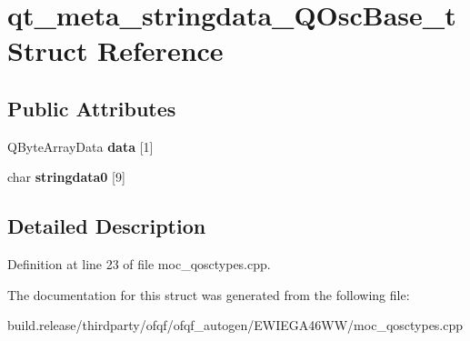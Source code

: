 \hypertarget{structqt__meta__stringdata___q_osc_base__t}{}\section{qt\+\_\+meta\+\_\+stringdata\+\_\+\+Q\+Osc\+Base\+\_\+t Struct Reference}
\label{structqt__meta__stringdata___q_osc_base__t}
\subsection*{Public Attributes}
\begin{DoxyCompactItemize}
\item 
\mbox{\label{structqt__meta__stringdata___q_osc_base__t_aad32b86ce8969891681451388e7d7b55}} 
Q\+Byte\+Array\+Data {\bfseries data} \mbox{[}1\mbox{]}
\item 
\mbox{\label{structqt__meta__stringdata___q_osc_base__t_a367262b6c3e044922b57d1fdef06cf06}} 
char {\bfseries stringdata0} \mbox{[}9\mbox{]}
\end{DoxyCompactItemize}


\subsection{Detailed Description}


Definition at line 23 of file moc\+\_\+qosctypes.\+cpp.



The documentation for this struct was generated from the following file\+:\begin{DoxyCompactItemize}
\item 
build.\+release/thirdparty/ofqf/ofqf\+\_\+autogen/\+E\+W\+I\+E\+G\+A46\+W\+W/moc\+\_\+qosctypes.\+cpp\end{DoxyCompactItemize}
